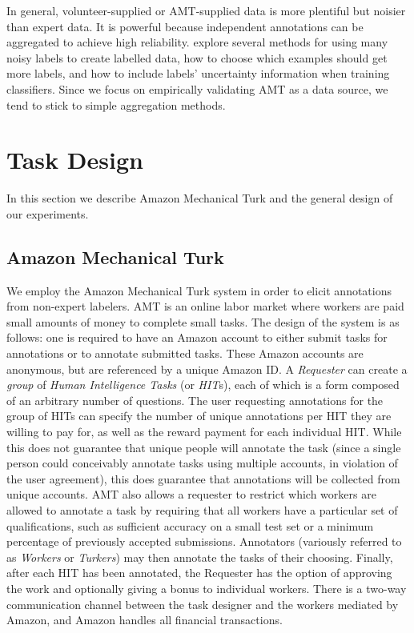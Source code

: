 \documentclass[11pt]{article}
\begin{document}
In general, volunteer-supplied or AMT-supplied data is more plentiful but noisier than expert data.  It is powerful because independent annotations can be aggregated to achieve high reliability.   explore several methods for using many noisy labels to create labelled data, how to choose which examples should get more labels, and how to include labels' uncertainty information when training classifiers.  Since we focus on empirically validating AMT as a data source, we tend to stick to simple aggregation methods.

\section{ Task Design }

In this section we describe Amazon Mechanical Turk and the general design of our experiments.

\subsection{ Amazon Mechanical Turk }

We employ the Amazon Mechanical Turk system in order to elicit annotations from non-expert labelers.  %
AMT is an online labor market where workers are paid small amounts of money to complete small tasks.  The design of the system is as follows: one is required to have an Amazon account to either submit tasks for annotations or to annotate submitted tasks.  These Amazon accounts are anonymous, but are referenced by a unique Amazon ID.  A \textit{Requester} can create a \textit{group} of \textit{Human Intelligence Tasks} (or \textit{HIT}s), each of which is a form composed of an arbitrary number of questions.  The user requesting annotations for the group of HITs can specify the number of unique annotations per HIT they are willing to pay for, as well as the reward payment for each individual HIT.  While this does not guarantee that unique people will annotate the task (since a single person could conceivably annotate tasks using multiple accounts, in violation of the user agreement), this does guarantee that annotations will be collected from unique accounts.  AMT also allows a requester to restrict which workers are allowed to annotate a task by requiring that all workers have a particular set of qualifications, such as sufficient accuracy on a small test set or a minimum percentage of previously accepted submissions.  Annotators (variously referred to as \textit{Workers} or \textit{Turkers}) may then annotate the tasks of their choosing. Finally, after each HIT has been annotated, the Requester has the option of approving the work and optionally giving a bonus to individual workers. There is a two-way communication channel between the task designer and the workers mediated by Amazon, and Amazon handles all financial transactions.
 
\end{document}
